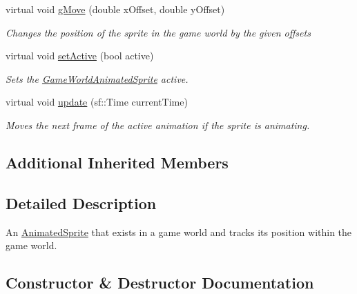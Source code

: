 \begin{DoxyCompactItemize}
virtual void \hyperlink{class_game_world_animated_sprite_ac1aa0ef5ec1a3278934238ea214624a4}{g\+Move} (double x\+Offset, double y\+Offset)
\begin{DoxyCompactList}\small\item\em Changes the position of the sprite in the game world by the given offsets \end{DoxyCompactList}\item 
virtual void \hyperlink{class_game_world_animated_sprite_a625b0d3876fbac51995bf048e94fd7e5}{set\+Active} (bool active)
\begin{DoxyCompactList}\small\item\em Sets the \hyperlink{class_game_world_animated_sprite}{Game\+World\+Animated\+Sprite} active. \end{DoxyCompactList}\item 
virtual void \hyperlink{class_game_world_animated_sprite_a6fab62c5ed11541027a88c695a8b6147}{update} (sf\+::\+Time current\+Time)
\begin{DoxyCompactList}\small\item\em Moves the next frame of the active animation if the sprite is animating. \end{DoxyCompactList}\end{DoxyCompactItemize}
\subsection*{Additional Inherited Members}


\subsection{Detailed Description}
An \hyperlink{class_animated_sprite}{Animated\+Sprite} that exists in a game world and tracks its position within the game world. 



\subsection{Constructor \& Destructor Documentation}
\mbox{\label{class_game_world_animated_sprite_a3833958136cf7e0f4a0141006e48e598}} 
